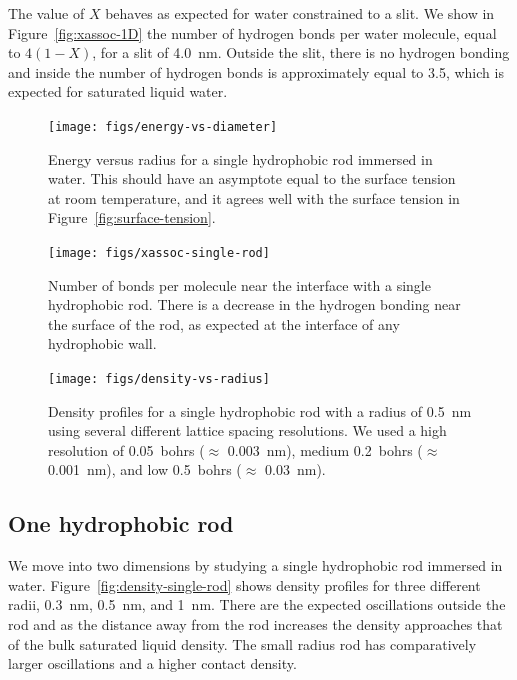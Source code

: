 \documentclass[letterpaper,twocolumn,amsmath,amssymb,prb]{revtex4-1}
\begin{document}
The value of $X$ behaves as expected for water constrained to a slit. We
show in Figure~\ref{fig:xassoc-1D} the number of hydrogen bonds per water 
molecule, equal to $4(1-X)$, for a slit of 4.0~nm.
Outside the slit, there is no hydrogen bonding and inside the number of hydrogen
bonds is approximately equal to 3.5, which is expected for saturated liquid
water.

\begin{figure}
\begin{center}
\texttt{[image: figs/energy-vs-diameter]}
\end{center}
\caption{ Energy versus radius for a single hydrophobic rod
immersed in water. This should have an asymptote equal to the surface
tension at room temperature, and it agrees well with the surface tension in
Figure~\ref{fig:surface-tension}. }
\label{fig:energy-vs-diameter}
\end{figure}

\begin{figure}
\begin{center}
\texttt{[image: figs/xassoc-single-rod]}
\end{center}
\caption{ Number of bonds per molecule near the interface with a single
hydrophobic rod. There is a decrease in the hydrogen bonding near the surface 
of the rod, as expected at the interface of any hydrophobic wall. }
\label{fig:xassoc-single-rod}
\end{figure}

\begin{figure}
\begin{center}
\texttt{[image: figs/density-vs-radius]}
\end{center}
\caption{ Density profiles for 
a single hydrophobic rod with a radius of 0.5~nm using several different 
lattice spacing resolutions. We used a high resolution of 0.05~bohrs ($\approx$
0.003~nm), 
medium 0.2~bohrs ($\approx$ 0.001~nm), and low 0.5~bohrs ($\approx$ 0.03~nm).}
\label{fig:densityresolution}
\end{figure}

\subsection{One hydrophobic rod}
We move into two dimensions by studying a single hydrophobic rod
immersed in water. Figure~\ref{fig:density-single-rod} shows density
profiles for three different radii, 0.3~nm, 0.5~nm, and 1~nm. There are the
expected oscillations outside the rod and as the distance away from the rod
increases
the density approaches that of the bulk saturated liquid density. The small
radius
rod has comparatively larger oscillations and a higher contact density.
\end{document}
